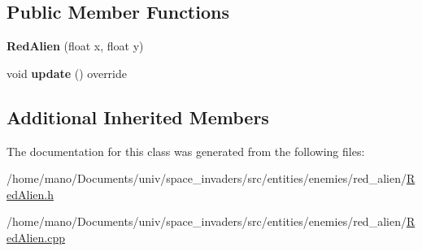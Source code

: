 \subsection*{Public Member Functions}
\begin{DoxyCompactItemize}
\item 
\mbox{\label{classentities_1_1enemies_1_1red__alien_1_1RedAlien_a481a0056973e547b92509fd4cced6282}} 
{\bfseries Red\+Alien} (float x, float y)
\item 
\mbox{\label{classentities_1_1enemies_1_1red__alien_1_1RedAlien_a29103fc5f6e44ea7b239b57fff8a1e59}} 
void {\bfseries update} () override
\end{DoxyCompactItemize}
\subsection*{Additional Inherited Members}


The documentation for this class was generated from the following files\+:\begin{DoxyCompactItemize}
\item 
/home/mano/\+Documents/univ/space\+\_\+invaders/src/entities/enemies/red\+\_\+alien/\hyperlink{RedAlien_8h}{Red\+Alien.\+h}\item 
/home/mano/\+Documents/univ/space\+\_\+invaders/src/entities/enemies/red\+\_\+alien/\hyperlink{RedAlien_8cpp}{Red\+Alien.\+cpp}\end{DoxyCompactItemize}
